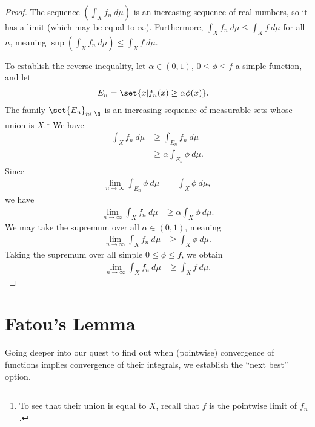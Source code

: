 \documentclass[12pt]{mypackage}
\begin{document}
\begin{proof}
  The sequence $\left( \int_{X}f_n\:d\mu \right)$ is an increasing sequence of real numbers, so it has a limit (which may be equal to $\infty$). Furthermore, $\int_{X}f_n\:d\mu \leq \int_{X}f\:d\mu$ for all $n$, meaning $\sup \left( \int_{X}^{} f_n\:d\mu \right) \leq \int_{X}^{} f\:d\mu$.\newline

  To establish the reverse inequality, let $\alpha\in (0,1)$, $0\leq \phi \leq f$ a simple function, and let
  \begin{align*}
    E_n &= \set{x | f_n(x) \geq \alpha \phi(x)}.
  \end{align*}
  The family $\set{E_n}_{n\in\N}$ is an increasing sequence of measurable sets whose union is $X$.\footnote{To see that their union is equal to $X$, recall that $f$ is the pointwise limit of $f_n$.} We have
  \begin{align*}
    \int_{X}^{} f_n\:d\mu &\geq \int_{E_n}^{} f_n\:d\mu\\
                          &\geq \alpha \int_{E_n}^{} \phi\:d\mu.
  \end{align*}
  Since
  \begin{align*}
    \lim_{n\rightarrow\infty} \int_{E_n}^{} \phi\:d\mu &= \int_{X}^{} \phi\:d\mu,
  \end{align*}
  we have
  \begin{align*}
    \lim_{n\rightarrow\infty} \int_{X}^{} f_n\:d\mu &\geq \alpha \int_{X}^{} \phi\:d\mu.
  \end{align*}
  We may take the supremum over all $\alpha\in (0,1)$, meaning
  \begin{align*}
    \lim_{n\rightarrow\infty} \int_{X}^{} f_n\:d\mu &\geq \int_{X}^{} \phi\:d\mu.
  \end{align*}
  Taking the supremum over all simple $0\leq \phi \leq f$, we obtain
  \begin{align*}
    \lim_{n\rightarrow\infty} \int_{X}^{} f_n\:d\mu &\geq \int_{X}^{} f\:d\mu.
  \end{align*}
\end{proof}
\section{Fatou's Lemma}%
Going deeper into our quest to find out when (pointwise) convergence of functions implies convergence of their integrals, we establish the ``next best'' option. 
\end{document}
